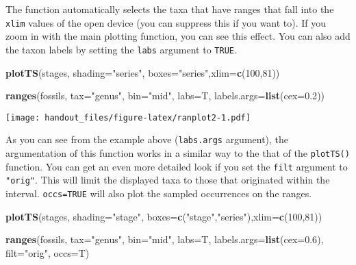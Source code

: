 \documentclass[]{article}
\newenvironment{Shaded}{\begin{snugshade}}{\end{snugshade}}
\newcommand{\DataTypeTok}[1]{\textcolor[rgb]{0.13,0.29,0.53}{#1}}
\newcommand{\DecValTok}[1]{\textcolor[rgb]{0.00,0.00,0.81}{#1}}
\newcommand{\FloatTok}[1]{\textcolor[rgb]{0.00,0.00,0.81}{#1}}
\newcommand{\KeywordTok}[1]{\textcolor[rgb]{0.13,0.29,0.53}{\textbf{#1}}}
\newcommand{\NormalTok}[1]{#1}
\newcommand{\StringTok}[1]{\textcolor[rgb]{0.31,0.60,0.02}{#1}}
\begin{document}
The function automatically selects the taxa that have ranges that fall
into the \texttt{xlim} values of the open device (you can suppress this
if you want to). If you zoom in with the main plotting function, you can
see this effect. You can also add the taxon labels by setting the
\texttt{labs} argument to \texttt{TRUE}.

\begin{Shaded}
\begin{Highlighting}[]
\KeywordTok{plotTS}\NormalTok{(stages, }\DataTypeTok{shading=}\StringTok{"series"}\NormalTok{, }\DataTypeTok{boxes=}\StringTok{"series"}\NormalTok{,}\DataTypeTok{xlim=}\KeywordTok{c}\NormalTok{(}\DecValTok{100}\NormalTok{,}\DecValTok{81}\NormalTok{))}

\KeywordTok{ranges}\NormalTok{(fossils, }\DataTypeTok{tax=}\StringTok{"genus"}\NormalTok{, }\DataTypeTok{bin=}\StringTok{"mid"}\NormalTok{, }\DataTypeTok{labs=}\NormalTok{T, }\DataTypeTok{labels.args=}\KeywordTok{list}\NormalTok{(}\DataTypeTok{cex=}\FloatTok{0.2}\NormalTok{))}
\end{Highlighting}
\end{Shaded}

\texttt{[image: handout\_files/figure-latex/ranplot2-1.pdf]}

As you can see from the example above (\texttt{labs.args} argument), the
argumentation of this function works in a similar way to the that of the
\texttt{plotTS()} function. You can get an even more detailed look if
you set the \texttt{filt} argument to \texttt{"orig"}. This will limit
the displayed taxa to those that originated within the interval.
\texttt{occs=TRUE} will also plot the sampled occurrences on the ranges.

\begin{Shaded}
\begin{Highlighting}[]
\KeywordTok{plotTS}\NormalTok{(stages, }\DataTypeTok{shading=}\StringTok{"stage"}\NormalTok{, }\DataTypeTok{boxes=}\KeywordTok{c}\NormalTok{(}\StringTok{"stage"}\NormalTok{,}\StringTok{"series"}\NormalTok{),}\DataTypeTok{xlim=}\KeywordTok{c}\NormalTok{(}\DecValTok{100}\NormalTok{,}\DecValTok{81}\NormalTok{))}

\KeywordTok{ranges}\NormalTok{(fossils, }\DataTypeTok{tax=}\StringTok{"genus"}\NormalTok{, }\DataTypeTok{bin=}\StringTok{"mid"}\NormalTok{, }\DataTypeTok{labs=}\NormalTok{T, }
  \DataTypeTok{labels.args=}\KeywordTok{list}\NormalTok{(}\DataTypeTok{cex=}\FloatTok{0.6}\NormalTok{), }\DataTypeTok{filt=}\StringTok{"orig"}\NormalTok{, }\DataTypeTok{occs=}\NormalTok{T)}
\end{Highlighting}
\end{Shaded}
\end{document}
